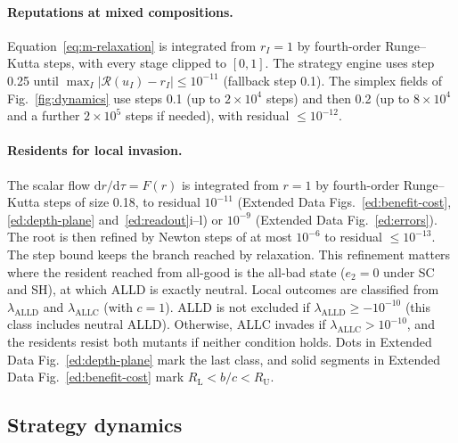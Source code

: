 \documentclass[10pt]{wlscirep}
\newcommand{\Rmap}{\mathscr{R}}            %
\newcommand{\dd}{\mathrm{d}}
\newcommand{\ALLC}{\mathrm{ALLC}}
\newcommand{\ALLD}{\mathrm{ALLD}}
\theoremstyle{plain}
\theoremstyle{remark}
\begin{document}
\paragraph{Reputations at mixed compositions.} Equation~\eqref{eq:m-relaxation} is integrated from $r_I=1$ by fourth-order Runge--Kutta steps, with every stage clipped to $[0,1]$. The strategy engine uses step 0.25 until $\max_I|\Rmap(u_I)-r_I|\leq10^{-11}$ (fallback step 0.1). The simplex fields of Fig.~\ref{fig:dynamics} use steps 0.1 (up to $2\times10^4$ steps) and then 0.2 (up to $8\times10^4$ and a further $2\times10^5$ steps if needed), with residual $\leq10^{-12}$.

\paragraph{Residents for local invasion.} The scalar flow $\dd r/\dd\tau=F(r)$ is integrated from $r=1$ by fourth-order Runge--Kutta steps of size 0.18, to residual $10^{-11}$ (Extended Data Figs.~\ref{ed:benefit-cost}, \ref{ed:depth-plane} and~\ref{ed:readout}i--l) or $10^{-9}$ (Extended Data Fig.~\ref{ed:errors}). The root is then refined by Newton steps of at most $10^{-6}$ to residual $\leq10^{-13}$. The step bound keeps the branch reached by relaxation. This refinement matters where the resident reached from all-good is the all-bad state ($e_2=0$ under SC and SH), at which ALLD is exactly neutral. Local outcomes are classified from $\lambda_{\ALLD}$ and $\lambda_{\ALLC}$ (with $c=1$). ALLD is not excluded if $\lambda_{\ALLD}\geq-10^{-10}$ (this class includes neutral ALLD). Otherwise, ALLC invades if $\lambda_{\ALLC}>10^{-10}$, and the residents resist both mutants if neither condition holds. Dots in Extended Data Fig.~\ref{ed:depth-plane} mark the last class, and solid segments in Extended Data Fig.~\ref{ed:benefit-cost} mark $R_{\mathrm L}<b/c<R_{\mathrm U}$.

\subsection{Strategy dynamics}
\end{document}
